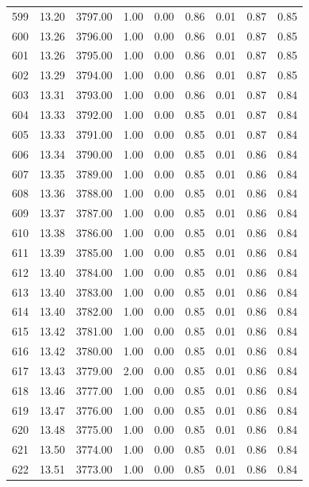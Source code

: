 \documentclass{article}\usepackage[]{graphicx}\usepackage[]{color}
\begin{document}
\begin{longtable}{rrrrrrrrr}
  599 & 13.20 & 3797.00 & 1.00 & 0.00 & 0.86 & 0.01 & 0.87 & 0.85 \\ 
  600 & 13.26 & 3796.00 & 1.00 & 0.00 & 0.86 & 0.01 & 0.87 & 0.85 \\ 
  601 & 13.26 & 3795.00 & 1.00 & 0.00 & 0.86 & 0.01 & 0.87 & 0.85 \\ 
  602 & 13.29 & 3794.00 & 1.00 & 0.00 & 0.86 & 0.01 & 0.87 & 0.85 \\ 
  603 & 13.31 & 3793.00 & 1.00 & 0.00 & 0.86 & 0.01 & 0.87 & 0.84 \\ 
  604 & 13.33 & 3792.00 & 1.00 & 0.00 & 0.85 & 0.01 & 0.87 & 0.84 \\ 
  605 & 13.33 & 3791.00 & 1.00 & 0.00 & 0.85 & 0.01 & 0.87 & 0.84 \\ 
  606 & 13.34 & 3790.00 & 1.00 & 0.00 & 0.85 & 0.01 & 0.86 & 0.84 \\ 
  607 & 13.35 & 3789.00 & 1.00 & 0.00 & 0.85 & 0.01 & 0.86 & 0.84 \\ 
  608 & 13.36 & 3788.00 & 1.00 & 0.00 & 0.85 & 0.01 & 0.86 & 0.84 \\ 
  609 & 13.37 & 3787.00 & 1.00 & 0.00 & 0.85 & 0.01 & 0.86 & 0.84 \\ 
  610 & 13.38 & 3786.00 & 1.00 & 0.00 & 0.85 & 0.01 & 0.86 & 0.84 \\ 
  611 & 13.39 & 3785.00 & 1.00 & 0.00 & 0.85 & 0.01 & 0.86 & 0.84 \\ 
  612 & 13.40 & 3784.00 & 1.00 & 0.00 & 0.85 & 0.01 & 0.86 & 0.84 \\ 
  613 & 13.40 & 3783.00 & 1.00 & 0.00 & 0.85 & 0.01 & 0.86 & 0.84 \\ 
  614 & 13.40 & 3782.00 & 1.00 & 0.00 & 0.85 & 0.01 & 0.86 & 0.84 \\ 
  615 & 13.42 & 3781.00 & 1.00 & 0.00 & 0.85 & 0.01 & 0.86 & 0.84 \\ 
  616 & 13.42 & 3780.00 & 1.00 & 0.00 & 0.85 & 0.01 & 0.86 & 0.84 \\ 
  617 & 13.43 & 3779.00 & 2.00 & 0.00 & 0.85 & 0.01 & 0.86 & 0.84 \\ 
  618 & 13.46 & 3777.00 & 1.00 & 0.00 & 0.85 & 0.01 & 0.86 & 0.84 \\ 
  619 & 13.47 & 3776.00 & 1.00 & 0.00 & 0.85 & 0.01 & 0.86 & 0.84 \\ 
  620 & 13.48 & 3775.00 & 1.00 & 0.00 & 0.85 & 0.01 & 0.86 & 0.84 \\ 
  621 & 13.50 & 3774.00 & 1.00 & 0.00 & 0.85 & 0.01 & 0.86 & 0.84 \\ 
  622 & 13.51 & 3773.00 & 1.00 & 0.00 & 0.85 & 0.01 & 0.86 & 0.84 \\ 

\end{longtable}
\end{document}
